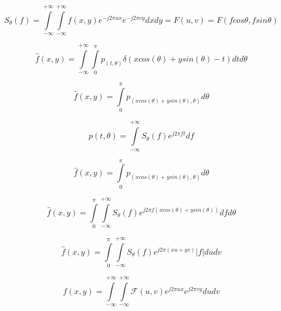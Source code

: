 \documentclass[journal, onecolumn, 11pt]{IEEEtran}
\begin{document}
\begin{equation}
    S_{\theta}(f) = \int\limits_{-\infty}^{+\infty}\int\limits_{-\infty}^{+\infty}f(x,y)e^{-j2\pi u x}e^{-j2\pi v y}dxdy = F(u,v) = F(f cos\theta,f sin\theta)
\end{equation}


\begin{equation}
    \hat{f}(x,y) = \int\limits_{-\infty}^{+\infty}\int\limits_{0}^{\pi}p_(t,\theta)\delta(xcos(\theta)+ysin(\theta)-t) dt d\theta
\end{equation}

\begin{equation}
    \hat{f}(x,y) = \int\limits_{0}^{\pi}p_(xcos(\theta)+ysin(\theta),\theta) d\theta
\end{equation}

\begin{equation}
    p(t,\theta) = \int\limits_{-\infty}^{+\infty}S_{\theta}(f)e^{j2\pi ft}df
\end{equation}



\begin{equation}
    \hat{f}(x,y) = \int\limits_{0}^{\pi}p_(xcos(\theta)+ysin(\theta),\theta) d\theta
\end{equation}




\begin{equation}
    \hat{f}(x,y) = \int\limits_{0}^{\pi}\int\limits_{-\infty}^{+\infty}S_{\theta}(f)e^{j2\pi f(xcos(\theta)+ysin(\theta))}df d\theta
\end{equation}



\begin{equation}
    \hat{f}(x,y) = \int\limits_{0}^{\pi}\int\limits_{-\infty}^{+\infty}S_{\theta}(f)e^{j2\pi (xu + yv)}|f|du dv
\end{equation}



\begin{equation}
    f(x,y) = \int\limits_{-\infty}^{+\infty}\int\limits_{-\infty}^{+\infty}\mathcal{F}(u,v)e^{j2\pi u x}e^{j2\pi v y}dudv 
\end{equation}
\end{document}
